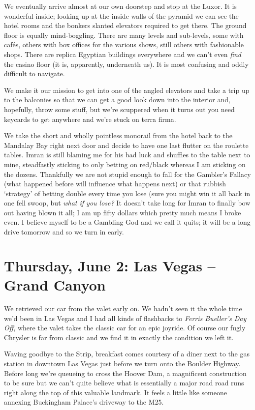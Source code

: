 \documentclass[a5paper,titlepage,11pt]{book}
\begin{document}
We eventually arrive almost at our own doorstep and stop at the Luxor. It is wonderful inside; looking up at the inside walls of the pyramid we can see the hotel rooms and the bonkers slanted elevators required to get there. The ground floor is equally mind-boggling. There are many levels and sub-levels, some with caf\'{e}s, others with box offices for the various shows, still others with fashionable shops. There are replica Egyptian buildings everywhere and we can't even \emph{find} the casino floor (it is, apparently, underneath us). It is most confusing and oddly difficult to navigate.

We make it our mission to get into one of the angled elevators and take a trip up to the balconies so that we can get a good look down into the interior and, hopefully, throw some stuff, but we're scuppered when it turns out you need keycards to get anywhere and we're stuck on terra firma.

We take the short and wholly pointless monorail from the hotel back to the Mandalay Bay right next door and decide to have one last flutter on the roulette tables. Imran is still blaming me for his bad luck and shuffles to the table next to mine, steadfastly sticking to only betting on red/black whereas I am sticking on the dozens. Thankfully we are not stupid enough to fall for the Gambler's Fallacy (what happened before will influence what happens next) or that rubbish `strategy' of betting double every time you lose (sure you might win it all back in one fell swoop, but \emph{what if you lose?}  It doesn't take long for Imran to finally bow out having blown it all; I am up fifty dollars which pretty much means I broke even. I believe myself to be a Gambling God and we call it quits; it will be a long drive tomorrow and so we turn in early.

\chapter[Las Vegas -- Grand Canyon]{Thursday, June 2: Las Vegas -- Grand Canyon}
We retrieved our car from the valet early on. We hadn't seen it the whole time we'd been in Las Vegas and I had all kinds of flashbacks to \emph{Ferris Bueller's Day Off}, where the valet takes the classic car for an epic joyride. Of course our fugly Chrysler is far from classic and we find it in exactly the condition we left it.

Waving goodbye to the Strip, breakfast comes courtesy of a diner next to the gas station in downtown Las Vegas just before we turn onto the Boulder Highway. Before long we're queueing to cross the Hoover Dam, a magnificent construction to be sure but we can't quite believe what is essentially a major road road runs right along the top of this valuable landmark. It feels a little like someone annexing Buckingham Palace's driveway to the M25.
\end{document}

